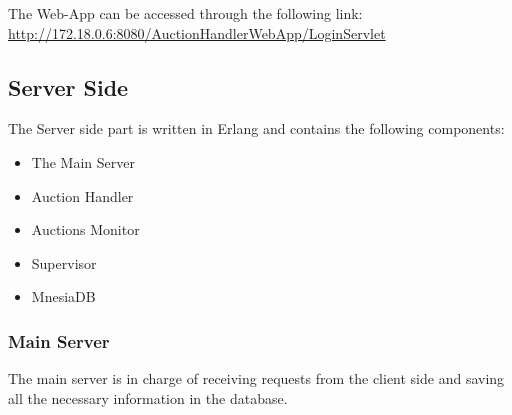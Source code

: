 \noindent The Web-App can be accessed through the following link: \\ \url{http://172.18.0.6:8080/AuctionHandlerWebApp/LoginServlet}

\subsection{Server Side}
\noindent The Server side part is written in Erlang and contains the following components:

\begin{itemize}
	\item The Main Server
	\item Auction Handler
	\item Auctions Monitor
	\item Supervisor
	\item MnesiaDB
\end{itemize}

\subsubsection{Main Server}
\noindent The main server is in charge of receiving requests from the client side and saving all the necessary information in the database.

